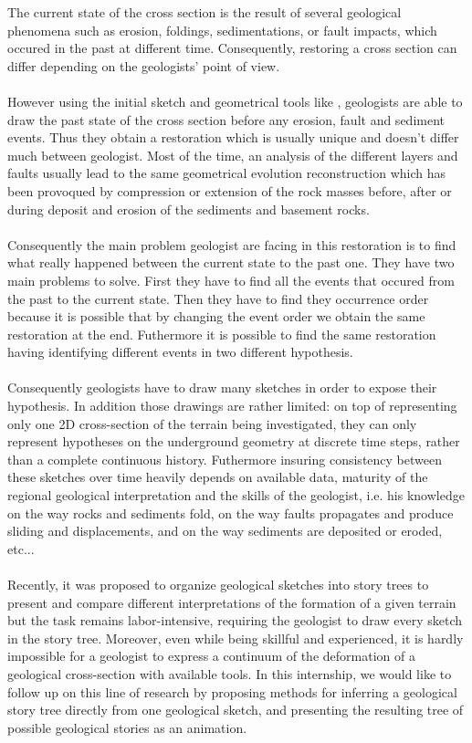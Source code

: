 \documentclass[12pt, a4paper]{report} %
\begin{document}
The current state of the cross section is the result of several geological phenomena such as erosion, foldings, sedimentations, or fault impacts, which occured in the past at different time. Consequently, restoring a cross section can differ depending on the geologists' point of view.\\\\
However using the initial sketch  and geometrical tools like \cite{Move}, geologists are able to draw the past state of the cross section before any erosion, fault and sediment events. Thus they obtain a restoration which is usually unique and doesn't differ much between geologist. 
Most of the time, an analysis of the different layers and faults usually lead to the same geometrical evolution reconstruction which has been provoqued by compression or extension of the rock masses before, after or during deposit and erosion of the sediments and basement rocks. \\\\
Consequently the main problem geologist are facing in this restoration is to find what really happened between the current state to the past one. They have two main problems to solve. First they have to find all the events that occured from the past to the current state. Then they have to find they occurrence order because it is possible that by changing the event order we obtain the same restoration at the end. Futhermore it is possible to find the same restoration having identifying different events in two different hypothesis. \\\\
Consequently geologists have to draw many sketches in order to expose their hypothesis. In addition those drawings are rather limited: on top of representing only one 2D cross-section of the terrain being investigated, they can only represent hypotheses on the underground geometry at discrete time steps, rather than a complete continuous history. Futhermore insuring consistency between these sketches over time heavily depends on available data, maturity of the regional geological interpretation and the skills of the geologist, i.e. his knowledge on the way rocks and sediments fold, on the way faults propagates and produce sliding and displacements, and on the way sediments are deposited or eroded, etc...\\\\
Recently, it was proposed to organize geological sketches into story trees to present and compare different interpretations of the formation of a given terrain \cite{lidal} but the task remains labor-intensive, requiring the geologist to draw every sketch in the story tree. Moreover, even while being skillful and experienced, it is hardly impossible for a geologist to express a continuum of the deformation of a geological cross-section with available tools.
In this internship, we would like to follow up on this line of research by proposing methods for inferring a geological story tree directly from one geological sketch, and presenting the resulting tree of possible geological stories as an animation.\\\\
\end{document}
